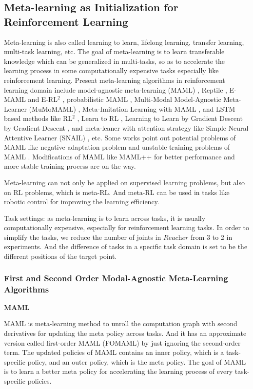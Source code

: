 \documentclass{article}
\begin{document}
\subsection{Meta-learning as Initialization for Reinforcement Learning}
Meta-learning is also called learning to learn, lifelong learning, transfer learning, multi-task learning, etc. The goal of meta-learning is to learn transferable knowledge which can be generalized in multi-tasks, so as to accelerate the learning process in some computationally expensive tasks especially like reinforcement learning. Present meta-learning algorithms in reinforcement learning domain include model-agnostic meta-learning (MAML) \cite{finn2017model}, Reptile \cite{nichol2018first}, E-MAML \cite{stadie2018some} and E-RL$^2$ \cite{stadie2018some}, probabilistic MAML \cite{finn2018probabilistic}, Multi-Modal Model-Agnostic Meta-Learner (MuMoMAML) \cite{vuorio2018toward}, Meta-Imitation Learning with MAML \cite{finn2017one}\cite{yu2018one}, and LSTM based methods \cite{ravi2016optimization} like RL$^2$ \cite{duan2016rl}, Learn to RL \cite{wang2016learning}, Learning to Learn by Gradient Descent by Gradient Descent \cite{andrychowicz2016learning}, and meta-leaner with attention strategy like Simple Neural Attentive Learner (SNAIL) \cite{mishra2017simple}, etc. Some works point out potential problems of MAML like negative adaptation problem \cite{deleu2018effects} and unstable training problems of MAML \cite{antoniou2018train}. Modifications of MAML like MAML++ \cite{antoniou2018train} for better performance and more stable training process are on the way.

Meta-learning can not only be applied on supervised learning problems, but also on RL problems, which is meta-RL. And meta-RL can be used in tasks like robotic control for improving the learning efficiency.

Task settings: as meta-learning is to learn across tasks, it is usually computationally expensive, especially for reinforcement learning tasks. In order to simplify the tasks, we reduce the number of joints in $\textit{Reacher}$ from 3 to 2 in experiments. And the difference of tasks in a specific task domain is set to be the different positions of the target point. 
\subsubsection{First and Second Order Modal-Agnostic Meta-Learning Algorithms}
\textbf{MAML}

MAML \cite{finn2017model} is meta-learning method to unroll the computation graph with second derivatives for updating the meta policy across tasks. And it has an approximate version called first-order MAML (FOMAML) by just ignoring the second-order term. The updated policies of MAML contains an inner policy, which is a task-specific policy, and an outer policy, which is the meta policy. The goal of MAML is to learn a better meta policy for accelerating the learning process of every task-specific policies. 
\end{document}
